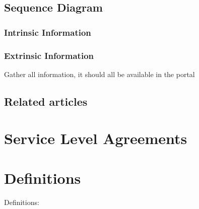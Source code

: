 \documentclass[letterpaper,10pt,english]{sphinxmanual}
\begin{document}
\section{Sequence Diagram}
\label{\detokenize{Questions:sequence-diagram}}
\noindent{}


\subsection{Intrinsic Information}
\label{\detokenize{Questions:intrinsic-information}}

\subsection{Extrinsic Information}
\label{\detokenize{Questions:extrinsic-information}}
Gather all information, it should all be available in the portal


\section{Related articles}
\label{\detokenize{Questions:related-articles}}

\chapter{Service Level Agreements}
\label{\detokenize{Questions:service-level-agreements}}

\chapter{Definitions}
\label{\detokenize{Questions:definitions}}
Definitions:

\begin{sphinxVerbatim}[commandchars=\\\{\}]

             
          



      

   
\end{sphinxVerbatim}
\end{document}
